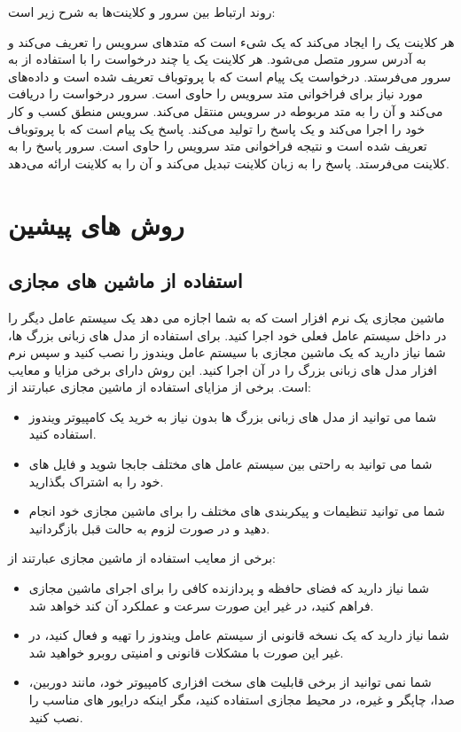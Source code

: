 روند ارتباط بین  سرور و کلاینت‌ها به شرح زیر است:

هر کلاینت یک  را ایجاد می‌کند که یک شیء است که متدهای سرویس را تعریف می‌کند و به آدرس  سرور متصل می‌شود.
هر کلاینت یک یا چند درخواست  را با استفاده از  به  سرور می‌فرستد. درخواست  یک پیام است که با پروتوباف تعریف شده است و داده‌های مورد نیاز برای فراخوانی متد سرویس را حاوی است.
 سرور درخواست  را دریافت می‌کند و آن را به متد مربوطه در سرویس  منتقل می‌کند. سرویس  منطق کسب و کار خود را اجرا می‌کند و یک پاسخ  را تولید می‌کند. پاسخ  یک پیام است که با پروتوباف تعریف شده است و نتیجه فراخوانی متد سرویس را حاوی است.
 سرور پاسخ  را به  کلاینت می‌فرستد.  پاسخ  را به زبان کلاینت تبدیل می‌کند و آن را به کلاینت ارائه می‌دهد.

\section{روش های پیشین}

\subsection{استفاده از ماشین های مجازی}
ماشین مجازی یک نرم افزار است که به شما اجازه می دهد یک سیستم عامل دیگر را در داخل سیستم عامل فعلی خود اجرا کنید. برای استفاده از مدل های زبانی بزرگ ها، شما نیاز دارید که یک ماشین مجازی با سیستم عامل ویندوز را نصب کنید و سپس نرم افزار مدل های زبانی بزرگ را در آن اجرا کنید.\cite{tickoo2010modeling} این روش دارای برخی مزایا و معایب است. برخی از مزایای استفاده از ماشین مجازی عبارتند از:
\begin{itemize}[label=-]
  \item
 شما می توانید از مدل های زبانی بزرگ ها بدون نیاز به خرید یک کامپیوتر ویندوز استفاده کنید.
 \item
شما می توانید به راحتی بین سیستم عامل های مختلف جابجا شوید و فایل های خود را به اشتراک بگذارید.
\item
 شما می توانید تنظیمات و پیکربندی های مختلف را برای ماشین مجازی خود انجام دهید و در صورت لزوم به حالت قبل بازگردانید.
\end{itemize}

برخی از معایب استفاده از ماشین مجازی عبارتند از:
\begin{itemize}[label=-]
  \item
   شما نیاز دارید که فضای حافظه و پردازنده کافی را برای اجرای ماشین مجازی فراهم کنید، در غیر این صورت سرعت و عملکرد آن کند خواهد شد.
   \item
    شما نیاز دارید که یک نسخه قانونی از سیستم عامل ویندوز را تهیه و فعال کنید، در غیر این صورت با مشکلات قانونی و امنیتی روبرو خواهید شد.
    \item
     شما نمی توانید از برخی قابلیت های سخت افزاری کامپیوتر خود، مانند دوربین، صدا، چاپگر و غیره، در محیط مجازی استفاده کنید، مگر اینکه درایور های مناسب را نصب کنید.
\end{itemize}


